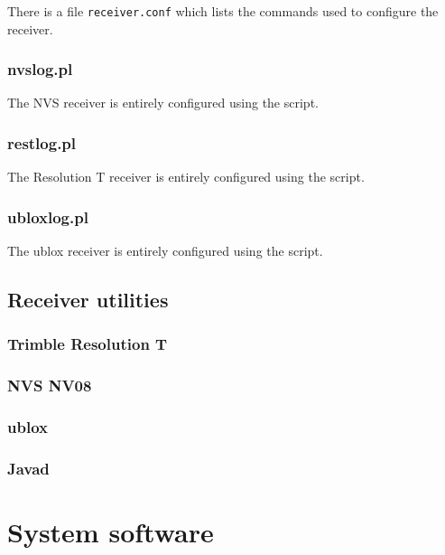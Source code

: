 \documentclass[11pt,a4paper,openany,oneside]{book}
\newcommand{\cc}[1]{{\texttt{#1}}}
\begin{document}
There is a file \cc{receiver.conf} which lists the commands used to configure the receiver.

\subsection{nvslog.pl}

The NVS receiver is entirely configured using the script.

\subsection{restlog.pl}

The Resolution T receiver is entirely configured using the script.

\subsection{ubloxlog.pl}

The ublox receiver is entirely configured using the script.

\section{Receiver utilities}

\subsection{Trimble Resolution T}

\subsection{NVS NV08}

\subsection{ublox}

\subsection{Javad}


\chapter{System software}
\end{document}
